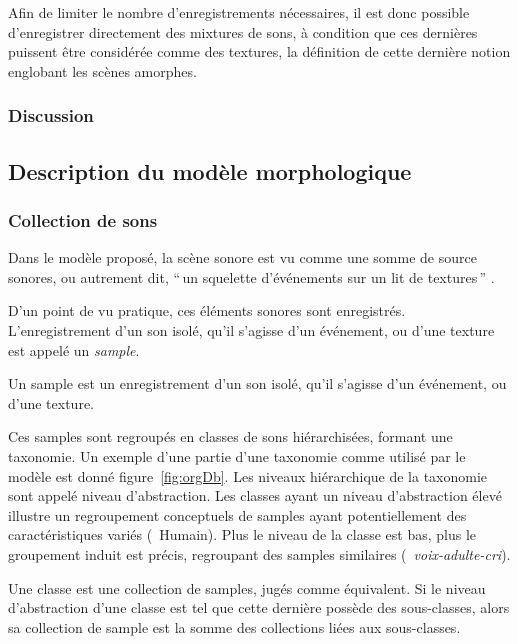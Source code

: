 Afin de limiter le nombre d'enregistrements nécessaires, il est donc possible d'enregistrer directement des mixtures de sons, à condition que ces dernières puissent être considérée comme des textures, la définition de cette dernière notion englobant les scènes amorphes.

\subsubsection{Discussion}

\subsection{Description du modèle morphologique}
\label{sec:ch4_modelDes}

\subsubsection{Collection de sons}
\label{sec:ch4_collecSons}

Dans le modèle proposé, la scène sonore est vu comme une somme de source sonores, ou autrement dit, ``\,un squelette d'événements sur un lit de textures\,'' \citep{nelken2013ear}. 

D'un point de vu pratique, ces éléments sonores sont enregistrés. L'enregistrement d'un son isolé, qu'il s'agisse d'un événement, ou d'une texture est appelé un \emph{sample}. 

\begin{mydef}
Un sample est un enregistrement d'un son isolé, qu'il s'agisse d'un événement, ou d'une texture.
\end{mydef}


Ces samples sont regroupés en classes de sons hiérarchisées, formant une taxonomie. Un exemple d'une partie d'une taxonomie comme utilisé par le modèle est donné figure~\ref{fig:orgDb}. Les niveaux hiérarchique de la taxonomie sont appelé niveau d'abstraction.  Les classes ayant un niveau d'abstraction élevé illustre un regroupement conceptuels de samples ayant potentiellement des caractéristiques variés (\ie~{Humain}). Plus le niveau de la classe est bas, plus le groupement induit est précis, regroupant des samples similaires (\ie~\emph{voix-adulte-cri}). 

\begin{mydef}
Une classe est une collection de samples, jugés comme équivalent. Si le niveau d'abstraction d'une classe est tel que cette dernière possède des sous-classes, alors sa collection de sample est la somme des collections liées aux sous-classes.
\end{mydef}

